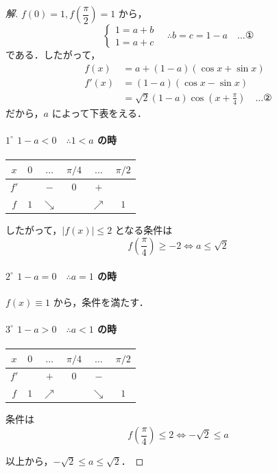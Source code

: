 \documentclass[../main.tex]{subfiles}
\begin{document}
\begin{proof}[解]
  $f(0) = 1, f\left(\dfrac{\pi}{2}\right) = 1$ から，
  \[
    \begin{cases}
      1 = a + b \\
      1 = a + c
    \end{cases}
    \quad \therefore b = c = 1 - a \quad \dots \text{①}
  \]
  である．したがって，
  \begin{align*}
    f(x) &= a + (1-a)(\cos x + \sin x) \\
    f'(x) &= (1-a)(\cos x - \sin x) \\
    &= \sqrt{2}(1-a)\cos\left(x + \frac{\pi}{4}\right) \quad \dots \text{②}
  \end{align*}
  だから，$a$ によって下表をえる．

  \paragraph{$1^\circ$ $1-a < 0 \quad \therefore 1 < a$ の時}

  \begin{center}
    \begin{tabular}{c|ccccc}
      $x$ & $0$ & $\dots$ & $\pi/4$ & $\dots$ & $\pi/2$ \\ \hline
      $f'$ & & $-$ & $0$ & $+$ & \\ \hline
      $f$ & $1$ & $\searrow$ & & $\nearrow$ & $1$
    \end{tabular}
  \end{center}

  したがって，$|f(x)| \le 2$ となる条件は
  \[
    f\left(\frac{\pi}{4}\right) \ge -2 \iff a \le \sqrt{2}
  \]

  \paragraph{$2^\circ$ $1-a = 0 \quad \therefore a = 1$ の時}
  $f(x) \equiv 1$ から，条件を満たす．

  \paragraph{$3^\circ$ $1-a > 0 \quad \therefore a < 1$ の時}

  \begin{center}
    \begin{tabular}{c|ccccc}
      $x$ & $0$ & $\dots$ & $\pi/4$ & $\dots$ & $\pi/2$ \\ \hline
      $f'$ & & $+$ & $0$ & $-$ & \\ \hline
      $f$ & $1$ & $\nearrow$ & & $\searrow$ & $1$
    \end{tabular}
  \end{center}

  条件は
  \[
    f\left(\frac{\pi}{4}\right) \le 2 \iff -\sqrt{2} \le a
  \]

  以上から，$ -\sqrt{2} \le a \le \sqrt{2}$．
\end{proof}
\end{document}
